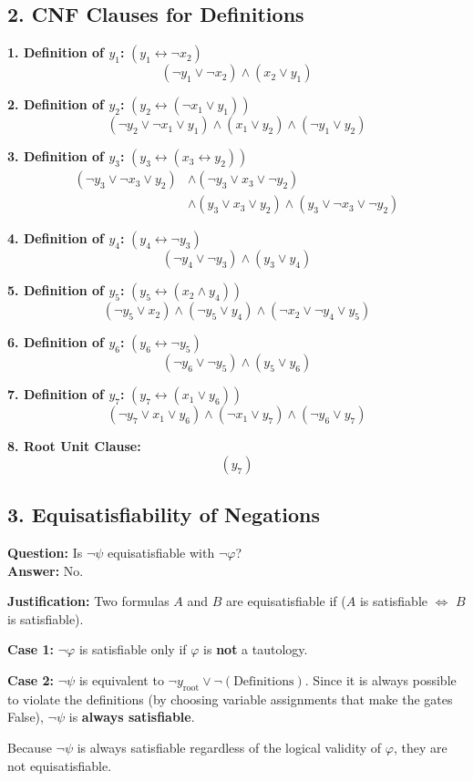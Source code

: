 \documentclass[12pt,a4paper]{article}
\begin{document}
\subsection*{2. CNF Clauses for Definitions}

\noindent \textbf{1. Definition of $y_1$:} $(y_1 \leftrightarrow \neg x_2)$
\[ (\neg y_1 \lor \neg x_2) \land (x_2 \lor y_1) \]

\noindent \textbf{2. Definition of $y_2$:} $(y_2 \leftrightarrow (\neg x_1 \lor y_1))$
\[ (\neg y_2 \lor \neg x_1 \lor y_1) \land (x_1 \lor y_2) \land (\neg y_1 \lor y_2) \]

\noindent \textbf{3. Definition of $y_3$:} $(y_3 \leftrightarrow (x_3 \leftrightarrow y_2))$
\[
\begin{aligned}
(\neg y_3 \lor \neg x_3 \lor y_2) &\land (\neg y_3 \lor x_3 \lor \neg y_2) \\
&\land (y_3 \lor x_3 \lor y_2) \land (y_3 \lor \neg x_3 \lor \neg y_2)
\end{aligned}
\]

\noindent \textbf{4. Definition of $y_4$:} $(y_4 \leftrightarrow \neg y_3)$
\[ (\neg y_4 \lor \neg y_3) \land (y_3 \lor y_4) \]

\noindent \textbf{5. Definition of $y_5$:} $(y_5 \leftrightarrow (x_2 \land y_4))$
\[ (\neg y_5 \lor x_2) \land (\neg y_5 \lor y_4) \land (\neg x_2 \lor \neg y_4 \lor y_5) \]

\noindent \textbf{6. Definition of $y_6$:} $(y_6 \leftrightarrow \neg y_5)$
\[ (\neg y_6 \lor \neg y_5) \land (y_5 \lor y_6) \]

\noindent \textbf{7. Definition of $y_7$:} $(y_7 \leftrightarrow (x_1 \lor y_6))$
\[ (\neg y_7 \lor x_1 \lor y_6) \land (\neg x_1 \lor y_7) \land (\neg y_6 \lor y_7) \]

\noindent \textbf{8. Root Unit Clause:}
\[ (y_7) \]

\subsection*{3. Equisatisfiability of Negations}
\textbf{Question:} Is $\neg \psi$ equisatisfiable with $\neg \varphi$? \\
\textbf{Answer:} No.

\textbf{Justification:}
Two formulas $A$ and $B$ are equisatisfiable if ($A$ is satisfiable $\iff$ $B$ is satisfiable).

\noindent \textbf{Case 1:} $\neg \varphi$ is satisfiable only if $\varphi$ is \textbf{not} a tautology.

\noindent \textbf{Case 2:} $\neg \psi$ is equivalent to $\neg y_{\text{root}} \lor \neg (\text{Definitions})$. Since it is always possible to violate the definitions (by choosing variable assignments that make the gates False), $\neg \psi$ is \textbf{always satisfiable}.

Because $\neg \psi$ is always satisfiable regardless of the logical validity of $\varphi$, they are not equisatisfiable.
\end{document}
